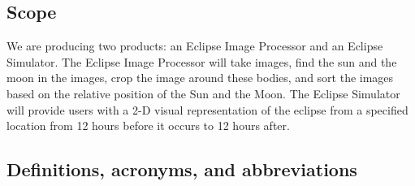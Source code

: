 \documentclass[10pt, onecolumn, draftclsnofoot, letterpaper, compsoc]{IEEEtran}
\begin{document}
\subsection{Scope}
We are producing two products: an Eclipse Image Processor and an Eclipse 
Simulator. The Eclipse Image Processor will take images, find the sun and the
moon in the images, crop the image around these bodies, and sort the images 
based on the relative position of the Sun and the Moon. The Eclipse Simulator 
will provide users with a 2-D visual representation of the eclipse from a 
specified location from 12 hours before it occurs to 12 hours after.

\subsection{Definitions, acronyms, and abbreviations}
\end{document}

